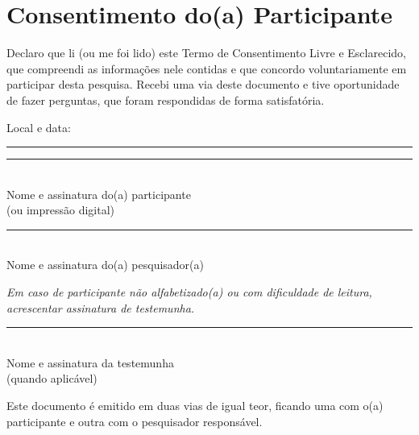 \documentclass[12pt,a4paper,brazil]{article}
\begin{document}
\vspace{1cm}

\section*{Consentimento do(a) Participante}

Declaro que li (ou me foi lido) este Termo de Consentimento Livre e Esclarecido, que compreendi as informações nele contidas e que concordo voluntariamente em participar desta pesquisa. Recebi uma via deste documento e tive oportunidade de fazer perguntas, que foram respondidas de forma satisfatória.

\vspace{1.5cm}

\noindent
\begin{minipage}[t]{0.55\textwidth}
Local e data:\\[1.5cm]
\rule{8cm}{0.4pt}
\end{minipage}

\vspace{1cm}

\noindent
\begin{minipage}[t]{0.48\textwidth}
\centering
\rule{7cm}{0.4pt}\\
Nome e assinatura do(a) participante\\
(ou impressão digital)
\end{minipage}
\hfill
\begin{minipage}[t]{0.48\textwidth}
\centering
\rule{7cm}{0.4pt}\\
Nome e assinatura do(a) pesquisador(a)
\end{minipage}

\vspace{1.5cm}

\noindent
\textit{Em caso de participante não alfabetizado(a) ou com dificuldade de leitura, acrescentar assinatura de testemunha.}

\vspace{1cm}

\noindent
\begin{minipage}[t]{0.48\textwidth}
\centering
\rule{7cm}{0.4pt}\\
Nome e assinatura da testemunha\\
(quando aplicável)
\end{minipage}

\vspace{1cm}

\noindent
\footnotesize{Este documento é emitido em duas vias de igual teor, ficando uma com o(a) participante e outra com o pesquisador responsável.}
\end{document}
